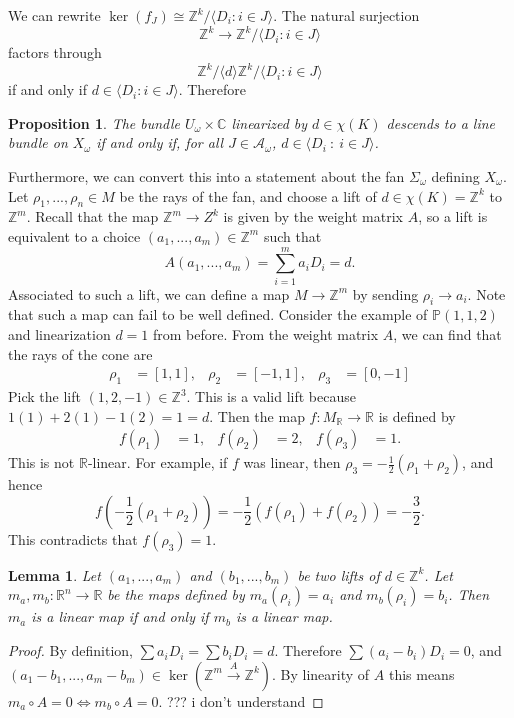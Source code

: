 \documentclass{article}
\newtheorem{prop}[theorem]{Proposition}
\newtheorem{lemma}[theorem]{Lemma}
\theoremstyle{definition}
\theoremstyle{remark}
\numberwithin{theorem}{section}
\newcommand{\C}{\mathbb{C}}
\newcommand{\Z}{\mathbb{Z}}
\newcommand{\R}{\mathbb{R}}
\newcommand{\bP}{\mathbb{P}}
\newcommand{\cA}{\mathcal{A}}
\begin{document}
	We can rewrite $\ker(f_J) \cong \Z^k/\langle D_i : i\in J\rangle$. The natural surjection $$\Z^k\to \Z^k/\langle D_i : i\in J\rangle$$
	factors through 
	$$\Z^k/\langle d\rangle \Z^k/\langle D_i : i\in J\rangle$$
	if and only if $d\in \langle D_i : i \in J\rangle.$ Therefore
	\begin{prop}
		The bundle $U_\omega\times \C$ linearized by $d\in \chi(K)$ descends to a line bundle on $X_\omega$ if and only if, for all $J\in\cA_\omega$, $d\in \langle D_i ~:~ i\in J\rangle$.
	\end{prop}
	Furthermore, we can convert this into a statement about the fan $\Sigma_\omega$ defining $X_\omega$. Let $\rho_1,...,\rho_n \in M$ be the rays of the fan, and choose a lift of $d\in \chi(K)=\Z^k$ to $\Z^m$. Recall that the map $\Z^m\to Z^k$ is given by the weight matrix $A$, so a lift is equivalent to a choice $(a_1,...,a_m)\in \Z^m$ such that
	$$A(a_1,...,a_m) = \sum_{i=1}^m a_i D_i = d.$$ 
	Associated to such a lift, we can define a map $M\to \Z^m$ by sending $\rho_i\to a_i$. Note that such a map can fail to be well defined. Consider the example of $\bP(1,1,2)$ and linearization $d=1$ from before. From the weight matrix $A$, we can find that the rays of the cone are 
	\begin{align*}
	\rho_1 &= [1,1],& \rho_2 &= [-1,1],& \rho_3 &= [0,-1]
	\end{align*}
	Pick the lift $(1,2,-1)\in \Z^3$. This is a valid lift because $1(1)+2(1)-1(2) = 1 = d$. Then the map $f:M_\R \to \R$ is defined by
	\begin{align*}
		f(\rho_1) &= 1,& f(\rho_2)&=2, & f(\rho_3)&=1.
	\end{align*}
	This is not $\R$-linear. For example, if $f$ was linear, then $\rho_3 = -\frac{1}{2}(\rho_1+\rho_2)$, and hence
	$$f\left(-\frac{1}{2}(\rho_1+\rho_2)\right) = -\frac{1}{2}(f(\rho_1)+f(\rho_2)) = -\frac{3}{2}.$$
	This contradicts that $f(\rho_3)=1$.
	\begin{lemma}
		Let $(a_1,...,a_m)$ and $(b_1,...,b_m)$ be two lifts of $d\in \Z^k$. Let $m_a,m_b:\R^n \to \R$ be the maps defined by $m_a(\rho_i) = a_i$ and $m_b(\rho_i) = b_i$. Then $m_a$ is a linear map if and only if $m_b$ is a linear map.
	\end{lemma}
	\begin{proof}
		By definition, $\sum a_i D_i = \sum b_i D_i = d$. Therefore $\sum (a_i-b_i)D_i =0$, and $(a_1-b_1,...,a_m-b_m) \in \ker(\Z^m \xrightarrow{A} \Z^k)$. By linearity of $A$ this means $m_a\circ A = 0 \iff m_b\circ A =0$. ??? i don't understand
	\end{proof}		
\end{document}
